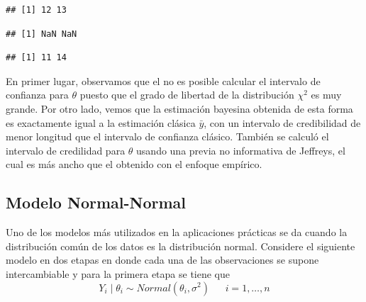 \begin{Eje}
\begin{knitrout}
\begin{kframe}
\begin{alltt}
\end{alltt}
\begin{verbatim}
## [1] 12 13
\end{verbatim}
\begin{alltt}
\hlstd{(}\hlopt{/}\hlstd{,} \hlstd{=}\hlopt{*}\hlopt{*}\hlopt{/}\hlstd{(}\hlopt{*} \hlstd{(}\hlopt{-}\hlopt{/}\hlstd{,} \hlstd{=}\hlopt{*}\hlopt{*}\hlopt{+}\hlstd{))}\hlopt{/}\hlstd{(}\hlopt{*}
\end{alltt}


{\ttfamily\noindent\color{warningcolor}{\#\# Warning in qchisq(alpha/2, df = 2 * y.bar * n): NaNs produced}}

{\ttfamily\noindent\color{warningcolor}{\#\# Warning in qchisq(1 - alpha/2, df = 2 * (y.bar * n + 1)): NaNs produced}}\begin{verbatim}
## [1] NaN NaN
\end{verbatim}
\begin{alltt}
\hlstd{(}\hlstd{(}\hlstd{,}\hlstd{),} \hlstd{=}\hlopt{+}\hlstd{,} 
\end{alltt}
\begin{verbatim}
## [1] 11 14
\end{verbatim}
\end{kframe}
\end{knitrout}
En primer lugar, observamos que el no es posible calcular el intervalo de confianza para $\theta$ puesto que el grado de libertad de la distribución $\chi^2$ es muy grande. Por otro lado, vemos que la estimación bayesina obtenida de esta forma es exactamente igual a la estimación clásica $\bar{y}$, con un intervalo de credibilidad de menor longitud que el intervalo de confianza clásico. También se calculó el intervalo de credilidad para $\theta$ usando una previa no informativa de Jeffreys, el cual es más ancho que el obtenido con el enfoque empírico.
\end{Eje}

\subsection{Modelo Normal-Normal}\label{Normal_Normal}
Uno de los modelos más utilizados en la aplicaciones prácticas se da cuando la distribución común de los datos es la distribución normal. Considere el siguiente modelo en dos etapas en donde cada una de las observaciones se supone intercambiable y para la primera etapa se tiene que
\begin{equation*}
Y_i \mid \theta_i \sim Normal(\theta_i,\sigma^2) \ \ \ \ \ \ \ i=1,\ldots,n
\end{equation*}

